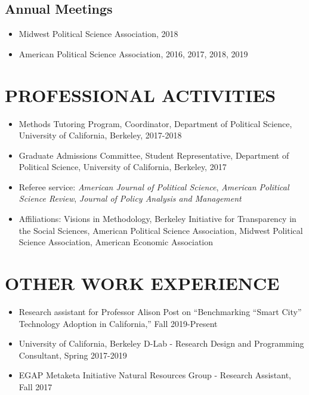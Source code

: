 \documentclass[11pt]{article}
\begin{document}
\subsection*{Annual Meetings}

\begin{itemize}[nosep]
\item[]Midwest Political Science Association, 2018
	\item[]American Political Science Association, 2016, 2017, 2018, 2019 	
	
	
\end{itemize}

\vspace{3mm}
\section*{PROFESSIONAL ACTIVITIES}


\begin{itemize}	

\item[]Methods Tutoring Program, Coordinator, Department of Political Science, University of California, Berkeley, 2017-2018
\item[]Graduate Admissions Committee, Student Representative, Department of Political Science, University of California, Berkeley, 2017
\item[]Referee service: \textit{American Journal of Political Science}, \textit{American Political Science Review}, \textit{Journal of Policy Analysis and Management}
\item[]Affiliations: Visions in Methodology, Berkeley Initiative for Transparency in the Social Sciences, American Political Science Association, Midwest Political Science Association, American Economic Association
\end{itemize}


\vspace{3mm}
\section*{OTHER WORK EXPERIENCE}
	\begin{itemize}
	\item[]Research assistant for Professor Alison Post on ``Benchmarking ``Smart City'' Technology Adoption in California,'' Fall 2019-Present
	\item[]University of California, Berkeley D-Lab - Research Design and Programming Consultant, Spring 2017-2019
	\item[]EGAP Metaketa Initiative Natural Resources Group - Research Assistant, Fall 2017
\end{itemize}
\end{document}
